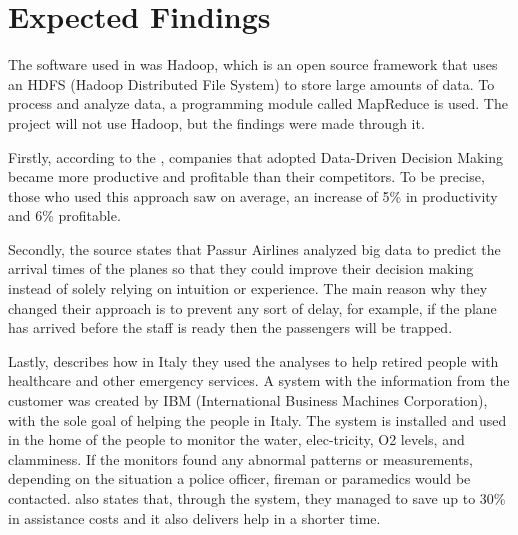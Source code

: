 \section{Expected Findings}
The software used in \cite{bigData} was Hadoop, which is an open source framework that uses an HDFS (Hadoop Distributed File System) to store large amounts of data. To process and analyze data, a programming module called MapReduce is used.  The project will not use Hadoop, but the findings were made through it.   

Firstly, according to the \cite{bigData}, companies that adopted Data-Driven Decision Making became more productive and profitable than their competitors.  To be precise, those who used this approach saw on average, an increase of 5\% in productivity and 6\% profitable.  

Secondly, the source states that Passur Airlines analyzed big data to predict the arrival times of the planes so that they could improve their decision making instead of solely relying on intuition or experience.  The main reason why they changed their approach is to prevent any sort of delay, for example, if the plane has arrived before the staff is ready then the passengers will be trapped.

Lastly, \cite{bigData} describes how in Italy they used the analyses to help retired people with healthcare and other emergency services. A system with the information from the customer was created by IBM (International Business Machines Corporation), with the sole goal of helping the people in Italy. The system is installed and used in the home of the people to monitor the water, elec-tricity, O2 levels, and clamminess. If the monitors found any abnormal patterns or measurements, depending on the situation a police officer, fireman or paramedics would be contacted. \cite{bigData} also states that, through the system, they managed to save up to 30\% in assistance costs and it also delivers help in a shorter time. 